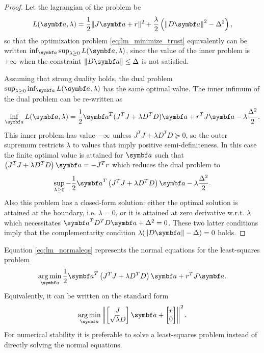 \begin{proof}
  Let the lagrangian of the problem be
  \begin{equation}
    L(\a, \lambda) = \frac{1}{2} \| J \a + r \|^2 + \frac{\lambda}{2} \left( \left\| D \a \right\|^2 - \Delta^2 \right),
  \end{equation}
  so that the optimization problem \eqref{eq:lm_minimize_trust} equivalently can be written $\inf_{\a} \sup_{\lambda \geq 0} L(\a, \lambda)$, since the value of the inner problem is $+\infty$ when the constraint $\| D \a \| \leq \Delta$ is not satisfied.

  Assuming that strong duality holds, the dual problem $\sup_{\lambda \geq 0} \inf_{\a} L(\a, \lambda)$ has the same optimal value. The inner infimum of the dual problem can be re-written as
  \begin{equation}
    \inf_{\a} L(\a, \lambda) = \frac{1}{2} \a^T ( J^T J + \lambda D^T D ) \a + r^T J \a - \lambda \frac{\Delta^2}{2}.
  \end{equation}
  This inner problem has value $-\infty$ unless $J^T J + \lambda D^T D \succeq 0$, so the outer supremum restricts $\lambda$ to values that imply positive semi-definiteness. In this case the finite optimal value is attained for $\a$ such that $\left(J^T J + \lambda D^T D \right) \a = -J^T r$ which reduces the dual problem to
  \begin{equation}
    \sup_{\lambda \geq 0} -\frac{1}{2} \a^T \left( J^T J + \lambda D^T D \right) \a - \lambda \frac{\Delta^2}{2}.
  \end{equation}
  Also this problem has a closed-form solution: either the optimal solution is attained at the boundary, i.e. $\lambda = 0$, or it is attained at zero derivative w.r.t. $\lambda$ which necessitates $\a^T D^T D \a + \Delta^2 = 0$. These two latter conditions imply that the complementarity condition $\lambda (\| D \a \| - \Delta) = 0$ holds.
\end{proof}

Equation \eqref{eq:lm_normaleqs} represents the normal equations for the least-squares problem
\begin{equation}
  \argmin_{\a} \frac{1}{2} \a^T \left( J^T J + \lambda D^T D \right) \a + r^T J \a.
\end{equation}
Equivalently, it can be written on the standard form
\begin{equation}
  \label{eq:lm_lsq}
  \argmin_{\a} \left\| \begin{bmatrix}
    J \\ \sqrt{\lambda} D
  \end{bmatrix} \a + \begin{bmatrix}
    r \\ 0
  \end{bmatrix} \right\|^2.
\end{equation}
For numerical stability it is preferable to solve a least-squares problem instead of directly solving the normal equations.

